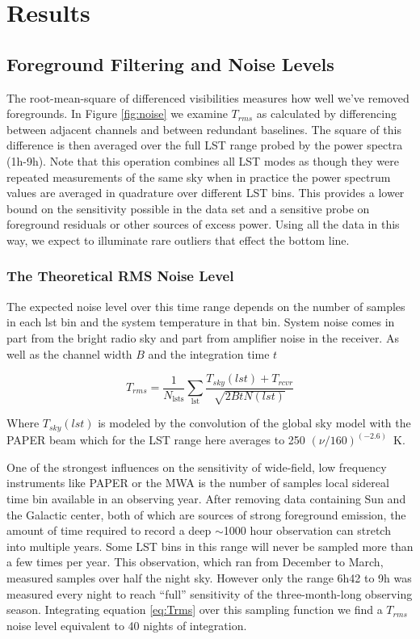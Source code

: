 \documentclass[preprint2]{aastex}
\begin{document}
\section{Results}
\label{sec:results}
\subsection{Foreground Filtering and Noise Levels}
\label{sec:noise}
The root-mean-square of differenced visibilities measures how well we've removed foregrounds.  In Figure \ref{fig:noise} we examine $T_{rms}$ as calculated by differencing between adjacent channels and between redundant baselines.  The square of this difference is then averaged over the full LST range probed by the power spectra (1h-9h). Note that this operation combines all LST modes as though they were repeated measurements of the same sky when in practice the power spectrum values are averaged in quadrature over different LST bins. This provides a lower bound on the sensitivity possible in the data set and a sensitive probe on foreground residuals or other sources of excess power.  Using all the data in this way, we expect to illuminate rare outliers that effect the bottom line.


\subsubsection{The Theoretical RMS Noise Level}

The expected noise level over this time range depends on the number of samples in each lst bin and the system temperature in that bin. System noise comes in part from the bright radio sky and part from amplifier noise in the receiver. As well as the channel width $B$ and the integration time $t$

\begin{equation}
T_{rms}  =\frac{1}{N_{\textrm{lsts}}}\sum_{\textrm{lst}} \frac{T_{sky}(lst) + T_{rcvr}}{\sqrt{2BtN(lst)}} 
\label{eq:Trms}
\end{equation}

Where $T_{sky}(lst)$ is modeled by the convolution of the global sky model \citep{deOliveiraCosta:2008p2242} with the PAPER beam \citep{Pober:2012p8800} which for the LST range here averages to 250 $(\nu/160)^(-2.6)$~K.



One of the strongest influences on the sensitivity of wide-field, low frequency instruments like PAPER or the MWA is the number of samples local sidereal time bin available in an observing year.   After removing data containing Sun and the Galactic center, both of which are sources of strong foreground emission, the amount of time required to record a deep $\sim$1000 hour observation can stretch into multiple years.  Some LST bins in this range will never be sampled more than a few times per year.  This observation, which ran from December to March, measured samples over half the night sky. However only the range 6h42 to 9h was measured every night to reach ``full'' sensitivity of the three-month-long observing season.  Integrating equation \ref{eq:Trms} over this sampling function we find a $T_{rms}$ noise level equivalent to 40 nights of integration. 
\end{document}
